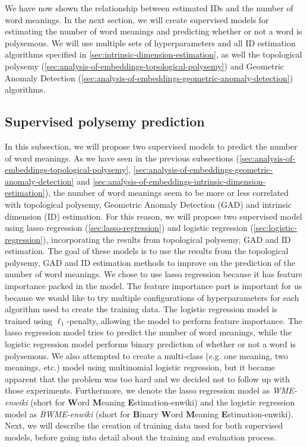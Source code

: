 We have now shown the relationship between estimated IDs and the number of word meanings. In the next section, we will create supervised models for estimating the number of word meanings and predicting whether or not a word is polysemous. We will use multiple sets of hyperparameters and all ID estimation algorithms specified in \cref{sec:intrinsic-dimension-estimation}, as well the topological polysemy (\cref{sec:analysis-of-embeddings-topological-polysemy}) and Geometric Anomaly Detection (\cref{sec:analysis-of-embeddings-geometric-anomaly-detection}) algorithms.

\subsection{Supervised polysemy prediction}
\label{sec:analysis-of-embeddings-supervised-polysemy-prediction}
In this subsection, we will propose two supervised models to predict the number of word meanings. As we have seen in the previous subsections (\cref{sec:analysis-of-embeddings-topological-polysemy}, \cref{sec:analysis-of-embeddings-geometric-anomaly-detection} and \cref{sec:analysis-of-embeddings-intrinsic-dimension-estimation}), the number of word meanings seem to be more or less correlated with topological polysemy, Geometric Anomaly Detection (GAD) and intrinsic dimension (ID) estimation. For this reason, we will propose two supervised model using lasso regression (\cref{sec:lasso-regression}) and logistic regression (\cref{sec:logistic-regression}), incorporating the results from topological polysemy, GAD and ID estimation. The goal of these models is to use the results from the topological polysemy, GAD and ID estimation methods to improve on the prediction of the number of word meanings. We chose to use lasso regression because it has feature importance packed in the model. The feature importance part is important for us because we would like to try multiple configurations of hyperparameters for each algorithm used to create the training data. The logistic regression model is trained using $\ell_1$-penalty, allowing the model to perform feature importance. The lasso regression model tries to predict the number of word meanings, while the logistic regression model performs binary prediction of whether or not a word is polysemous. We also attempted to create a multi-class (e.g. one meaning, two meanings, etc.) model using multinomial logistic regression, but it became apparent that the problem was too hard and we decided not to follow up with those experiments. Furthermore, we denote the lasso regression model as \textit{WME-enwiki} (short for \textbf{W}ord \textbf{M}eaning \textbf{E}stimation-enwiki) and the logistic regression model as \textit{BWME-enwiki} (short for \textbf{B}inary \textbf{W}ord \textbf{M}eaning \textbf{E}stimation-enwiki). Next, we will describe the creation of training data used for both supervised models, before going into detail about the training and evaluation process.

